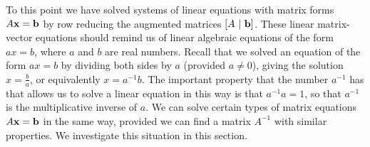 \label{sec:inverse_intro}

To this point we have solved systems of linear equations with matrix forms $A \mathbf{x} = \mathbf{b}$ by row reducing the augmented matrices $[A \ | \ \mathbf{b}]$. These linear matrix-vector equations should remind us of linear algebraic equations of the form $ax = b$, where $a$ and $b$ are real numbers. Recall that we solved an equation of the form $ax=b$ by dividing both sides by $a$ (provided $a \neq 0$), giving the solution $x = \frac{b}{a}$, or equivalently $x = a^{-1}b$. The important property that the number $a^{-1}$ has that allows us to solve a linear equation in this way is that $a^{-1}a = 1$, so that $a^{-1}$ is the multiplicative inverse of $a$. We can solve certain types of matrix equations $A \mathbf{x} = \mathbf{b}$ in the same way, provided we can find a matrix $A^{-1}$ with similar properties. We investigate this situation in this section.

